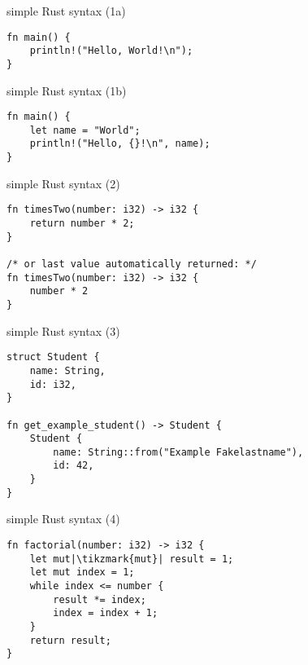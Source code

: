 \usetikzlibrary{positioning,shapes.callouts}
\begin{frame}[fragile,label=rustHelloWorld1a]{simple Rust syntax (1a)}
\begin{verbatim}
fn main() {
    println!("Hello, World!\n");
}
\end{verbatim}
\end{frame}

\begin{frame}[fragile,label=rustHelloWorld1b]{simple Rust syntax (1b)}
\begin{verbatim}
fn main() {
    let name = "World";
    println!("Hello, {}!\n", name);
}
\end{verbatim}
\end{frame}

\begin{frame}[fragile,label=rustHelloWorld2]{simple Rust syntax (2)}
\begin{verbatim}
fn timesTwo(number: i32) -> i32 {
    return number * 2;
}

/* or last value automatically returned: */
fn timesTwo(number: i32) -> i32 {
    number * 2
}
\end{verbatim}
\end{frame}

\begin{frame}[fragile,label=rustHelloWorld3]{simple Rust syntax (3)}
    \begin{verbatim}
struct Student {
    name: String,
    id: i32,
}

fn get_example_student() -> Student {
    Student {
        name: String::from("Example Fakelastname"),
        id: 42,
    }
}
\end{verbatim}
\end{frame}

\begin{frame}[fragile,label=rustHelloWorld4]{simple Rust syntax (4)}
    \begin{verbatim}
fn factorial(number: i32) -> i32 {
    let mut|\tikzmark{mut}| result = 1;
    let mut index = 1;
    while index <= number {
        result *= index;
        index = index + 1;
    }
    return result;
}
\end{verbatim}
\end{frame}

